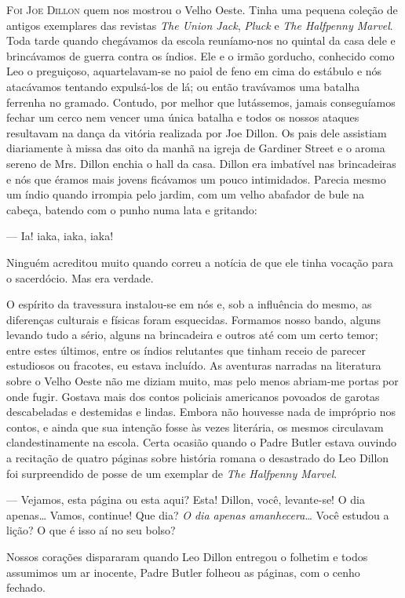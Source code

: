\textsc{Foi Joe Dillon} quem nos mostrou o Velho Oeste. Tinha uma pequena
coleção de antigos exemplares das revistas \textit{The Union Jack},
\textit{Pluck} e \textit{The Halfpenny Marvel}. Toda tarde quando chegávamos da escola
reuníamo-nos no quintal da casa dele e brincávamos de guerra contra os
índios. Ele e o irmão gorducho, conhecido como Leo o preguiçoso,
aquartelavam-se no paiol de feno em cima do estábulo e nós atacávamos
tentando expulsá-los de lá; ou então travávamos uma batalha ferrenha
no gramado. Contudo, por melhor que lutássemos, jamais conseguíamos
fechar um cerco nem vencer uma única batalha e todos os nossos
ataques resultavam na dança da vitória realizada por Joe Dillon. Os
pais dele assistiam diariamente à missa das oito da manhã na igreja de
Gardiner Street e o aroma sereno de Mrs. Dillon enchia o hall da casa.
Dillon era imbatível nas brincadeiras e nós que éramos mais jovens
ficávamos um pouco intimidados. Parecia mesmo um índio quando irrompia
pelo jardim, com um velho abafador de bule na cabeça, batendo com o
punho numa lata e gritando:

--- Ia! iaka, iaka, iaka!

Ninguém acreditou muito quando correu a notícia de que ele tinha
vocação para o sacerdócio. Mas era verdade.

O espírito da travessura instalou-se em nós e, sob a influência do
mesmo, as diferenças culturais e físicas foram esquecidas. Formamos
nosso bando, alguns levando tudo a sério, alguns na brincadeira e
outros até com um certo temor; entre estes últimos, entre os índios
relutantes que tinham receio de parecer estudiosos ou fracotes, eu
estava incluído. As aventuras narradas na literatura sobre o Velho
Oeste não me diziam muito, mas pelo menos abriam-me portas por onde
fugir. Gostava mais dos contos policiais americanos povoados de
garotas descabeladas e destemidas e lindas. Embora não houvesse nada
de impróprio nos contos, e ainda que sua intenção fosse às vezes
literária, os mesmos circulavam clandestinamente na escola. Certa
ocasião quando o Padre Butler estava ouvindo a recitação de quatro
páginas sobre história romana o desastrado do Leo Dillon foi
surpreendido de posse de um exemplar de \textit{The Halfpenny Marvel}.

--- Vejamos, esta página ou esta aqui? Esta! Dillon, você,
levante-se! O dia apenas\ldots{} Vamos, continue! Que dia? \textit{O dia apenas
amanhecera}\ldots{} Você estudou a lição? O que é isso aí no seu bolso?

Nossos corações dispararam quando Leo Dillon entregou o folhetim e
todos assumimos um ar inocente, Padre Butler folheou as páginas, com o
cenho fechado.

